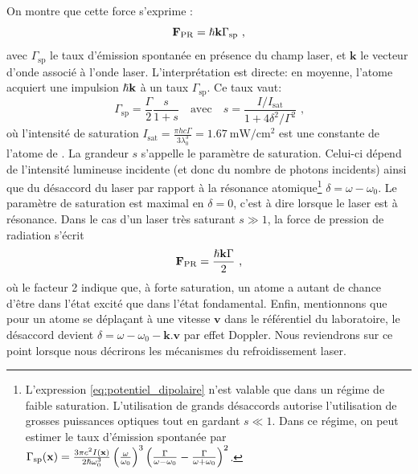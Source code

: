 On montre que cette force s'exprime \citep{cohen2012processus}:
\begin{equation}
\mathbf{F}_{\mathrm{PR}}=\hslash \mathbf{k} \Gamma_{\mathrm{sp}} \text{ ,}
\end{equation}
avec $\Gamma_{\mathrm{sp}}$ le taux d'émission spontanée en présence du champ laser, et $\mathbf{k}$ le vecteur d'onde associé à l'onde laser. L'interprétation est directe: en moyenne, l'atome acquiert une impulsion $\hslash \mathbf{k}$ à un taux $\Gamma_{\mathrm{sp}}$. Ce taux vaut:
\begin{equation}
\Gamma_{\mathrm{sp}}=\frac{\Gamma}{2} \frac{s}{1+s} \quad \text{avec} \quad s=\frac{I/I_{\mathrm{sat}}}{1+4\delta^2/\Gamma^2} \text{ ,}
\end{equation}
où l'intensité de saturation $I_{\mathrm{sat}}=\frac{\pi h c \Gamma}{3\lambda_0^3}=\SI{1.67}{\milli\watt\per\centi\metre^2}$ est une constante de l'atome de . La grandeur $s$ s'appelle le paramètre de saturation. Celui-ci dépend de l'intensité lumineuse incidente (et donc du nombre de photons incidents) ainsi que du désaccord du laser par rapport à la résonance atomique\footnote{L'expression \ref{eq:potentiel_dipolaire} n'est valable que dans un régime de faible saturation. L'utilisation de grands désaccords autorise l'utilisation de grosses puissances optiques tout en gardant $s\ll 1$. Dans ce régime, on peut estimer le taux d'émission spontanée par $\Gamma_{\mathrm{sp}}(\mathbf{x})=\frac{3 \pi c^2 I(\mathbf{x})}{2\hslash \omega_0^3} \left( \frac{\omega}{\omega_0}\right)^3 \left( \frac{\Gamma}{\omega-\omega_0}-\frac{\Gamma}{\omega+\omega_0} \right)^2$.} $\delta = \omega-\omega_0$.  Le paramètre de saturation est maximal en $\delta=0$, c'est à dire lorsque le laser est à résonance. Dans le cas d'un laser très saturant $s \gg 1$, la force de pression de radiation s'écrit
\begin{equation}
\mathbf{F}_{\mathrm{PR}}=\frac{\hslash \mathbf{k} \Gamma}{2} \text{ ,}
\end{equation}
où le facteur 2 indique que, à forte saturation, un atome a autant de chance d'être dans l'état excité que dans l'état fondamental. Enfin, mentionnons que pour un atome se déplaçant à une vitesse $\mathbf{v}$ dans le référentiel du laboratoire, le désaccord devient $\delta=\omega-\omega_0-\mathbf{k}.\mathbf{v}$ par effet Doppler. Nous reviendrons sur ce point lorsque nous décrirons les mécanismes du refroidissement laser.





